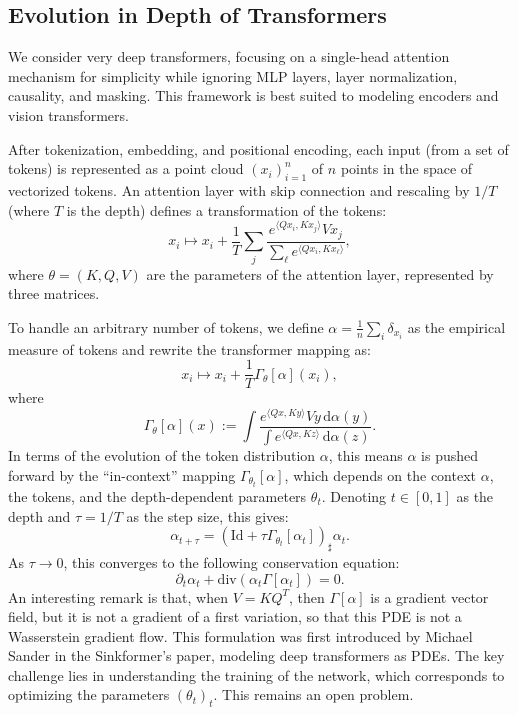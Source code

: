 \subsection{Evolution in Depth of Transformers}

We consider very deep transformers, focusing on a single-head attention mechanism for simplicity while ignoring MLP layers, layer normalization, causality, and masking. This framework is best suited to modeling encoders and vision transformers. 

After tokenization, embedding, and positional encoding, each input (from a set of tokens) is represented as a point cloud $(x_i)_{i=1}^n$ of $n$ points in the space of vectorized tokens. An attention layer with skip connection and rescaling by $1/T$ (where $T$ is the depth) defines a transformation of the tokens:
\begin{equation*}
    x_i \mapsto x_i + \frac{1}{T} \sum_j \frac{e^{\langle Q x_i, K x_j \rangle} V x_j}{\sum_{\ell} e^{\langle Q x_i, K x_\ell \rangle}},
\end{equation*}
where $\theta = (K, Q, V)$ are the parameters of the attention layer, represented by three matrices.

To handle an arbitrary number of tokens, we define $\alpha = \frac{1}{n} \sum_i \delta_{x_i}$ as the empirical measure of tokens and rewrite the transformer mapping as:
\begin{equation*}
    x_i \mapsto x_i + \frac{1}{T} \Gamma_\theta[\alpha](x_i),
\end{equation*}
where
\begin{equation*}
    \Gamma_\theta[\alpha](x) := \int \frac{e^{\langle Q x, K y \rangle} V y \, \mathrm{d} \alpha(y)}{\int e^{\langle Q x, K z \rangle} \, \mathrm{d} \alpha(z)}.
\end{equation*}
In terms of the evolution of the token distribution $\alpha$, this means $\alpha$ is pushed forward by the ``in-context'' mapping $\Gamma_{\theta_t}[\alpha]$, which depends on the context $\alpha$, the tokens, and the depth-dependent parameters $\theta_t$. Denoting $t \in [0, 1]$ as the depth and $\tau = 1/T$ as the step size, this gives:
\begin{equation*}
    \alpha_{t+\tau} = (\mathrm{Id} + \tau \Gamma_{\theta_t}[\alpha_t])_\sharp \alpha_t.
\end{equation*}
As $\tau \to 0$, this converges to the following conservation equation:
\begin{equation*}
    \partial_t \alpha_t + \mathrm{div}(\alpha_t \Gamma[\alpha_t]) = 0.
\end{equation*}
An interesting remark is that, when $V=KQ^T$, then $\Gamma[\alpha]$ is a gradient vector field, but it is not a gradient of a first variation, so that this PDE is not a Wasserstein gradient flow. 
%
This formulation was first introduced by Michael Sander in the Sinkformer's paper, modeling deep transformers as PDEs. The key challenge lies in understanding the training of the network, which corresponds to optimizing the parameters $(\theta_t)_t$. This remains an open problem.



